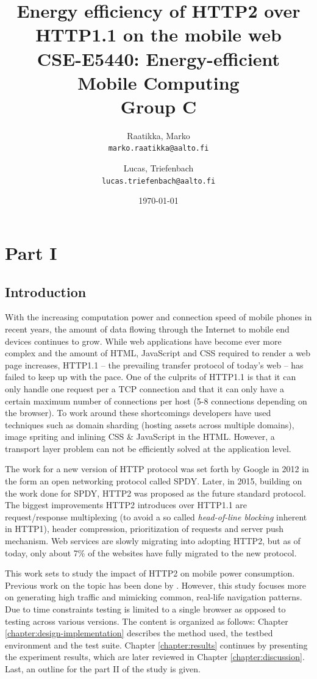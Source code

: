 \documentclass{article}
\author{
  Raatikka, Marko\\
  \texttt{marko.raatikka@aalto.fi}
  \and
  Lucas, Triefenbach\\
  \texttt{lucas.triefenbach@aalto.fi}
}
\title{Energy efficiency of HTTP2 over HTTP1.1 on the mobile web
\\
\vspace{5mm}
\large{CSE-E5440: Energy-efficient Mobile Computing\\Group C}
}
\date{\today}
\begin{document}
\maketitle
\clearpage

\section{Part I}

\subsection{Introduction}
With the increasing computation power and connection speed of mobile phones in recent years, the amount of data flowing through the Internet to mobile end devices continues to grow. While web applications have become ever more complex and the amount of HTML, JavaScript and CSS required to render a web page increases, HTTP1.1 -- the prevailing transfer protocol of today's web -- has failed to keep up with the pace. One of the culprits of HTTP1.1 is that it can only handle one request per a TCP connection and that it can only have a certain maximum number of connections per host (5-8 connections depending on the browser). To work around these shortcomings developers have used techniques such as domain sharding (hosting assets across multiple domains), image spriting and inlining CSS \& JavaScript in the HTML. However, a transport layer problem can not be efficiently solved at the application level.

The work for a new version of HTTP protocol was set forth by Google in 2012 in the form an open networking protocol called SPDY. Later, in 2015, building on the work done for SPDY, HTTP2 was proposed as the future standard protocol. The biggest improvements HTTP2 introduces over HTTP1.1 are request/response multiplexing (to avoid a so called \emph{head-of-line blocking} inherent in HTTP1), header compression, prioritization of requests and server push mechanism. Web services are slowly migrating into adopting HTTP2, but as of today, only about 7\% of the websites have fully migrated to the new protocol. \citep{google-spdy}\citep{http2_stats}\citep{http2}

This work sets to study the impact of HTTP2 on mobile power consumption. Previous work on the topic has been done by \citep{previous_work}. However, this study focuses more on generating high traffic and mimicking common, real-life navigation patterns. Due to time constraints testing is limited to a single browser as opposed to testing across various versions. The content is organized as follows: Chapter \ref{chapter:design-implementation} describes the method used, the testbed environment and the test suite. Chapter \ref{chapter:results} continues by presenting the experiment results, which are later reviewed in Chapter \ref{chapter:discussion}. Last, an outline for the part II of the study is given.
\end{document}
